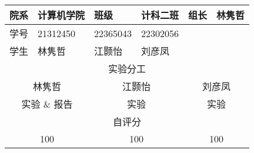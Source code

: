 \documentclass{article}
\begin{document}
\begin{table}[H]
    \centering
    \begin{tabular}{|l|l|l|l|l|l|}
        \hline
        院系 & 计算机学院 & 班级 & 计科二班 & 组长 & 林隽哲 \\
        \hline
        学号 & 21312450 & 22365043 & 22302056 & & \\
        \hline
        学生 & 林隽哲 & 江颢怡 & 刘彦凤 & & \\
        \hline
        \multicolumn{6}{|c|}{实验分工} \\
        \hline
        \multicolumn{2}{|c|}{林隽哲} & \multicolumn{2}{c|}{江颢怡} & \multicolumn{2}{c|}{刘彦凤} \\
        \hline
        \multicolumn{2}{|c|}{实验 \& 报告} & \multicolumn{2}{c|}{实验} & \multicolumn{2}{c|}{实验} \\
        \hline
        \multicolumn{6}{|c|}{自评分} \\
        \hline
        \multicolumn{2}{|c|}{100} & \multicolumn{2}{c|}{100} & \multicolumn{2}{c|}{100} \\
        \hline
    \end{tabular}
\end{table}
\end{document}
